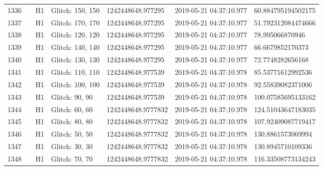 \begin{longtable}{lllllll}
1336 &                                                    &       H1 &  Glitch: 150, 150 &   1242448648.977295 &  2019-05-21 04:37:10.977 &  60.884795194502175 \\
1337 &                                                    &       H1 &  Glitch: 170, 170 &   1242448648.977295 &  2019-05-21 04:37:10.977 &  51.792312084474666 \\
1338 &                                                    &       H1 &  Glitch: 120, 120 &   1242448648.977295 &  2019-05-21 04:37:10.977 &     78.995066870946 \\
1339 &                                                    &       H1 &  Glitch: 140, 140 &   1242448648.977295 &  2019-05-21 04:37:10.977 &    66.6679852170373 \\
1340 &                                                    &       H1 &  Glitch: 130, 130 &   1242448648.977295 &  2019-05-21 04:37:10.977 &    72.7748282656168 \\
1341 &                                                    &       H1 &  Glitch: 110, 110 &   1242448648.977539 &  2019-05-21 04:37:10.978 &   85.53771612992536 \\
1342 &                                                    &       H1 &  Glitch: 100, 100 &   1242448648.977539 &  2019-05-21 04:37:10.978 &   92.55839082371006 \\
1343 &                                                    &       H1 &    Glitch: 90, 90 &   1242448648.977539 &  2019-05-21 04:37:10.978 &  100.07585695133162 \\
1344 &                                                    &       H1 &    Glitch: 60, 60 &  1242448648.9777832 &  2019-05-21 04:37:10.978 &  124.51043647183035 \\
1345 &                                                    &       H1 &    Glitch: 80, 80 &  1242448648.9777832 &  2019-05-21 04:37:10.978 &  107.92409087719417 \\
1346 &                                                    &       H1 &    Glitch: 50, 50 &  1242448648.9777832 &  2019-05-21 04:37:10.978 &   130.8861573069994 \\
1347 &                                                    &       H1 &    Glitch: 30, 30 &  1242448648.9777832 &  2019-05-21 04:37:10.978 &   130.8945710109336 \\
1348 &                                                    &       H1 &    Glitch: 70, 70 &  1242448648.9777832 &  2019-05-21 04:37:10.978 &  116.33508773134243 \\

\end{longtable}
